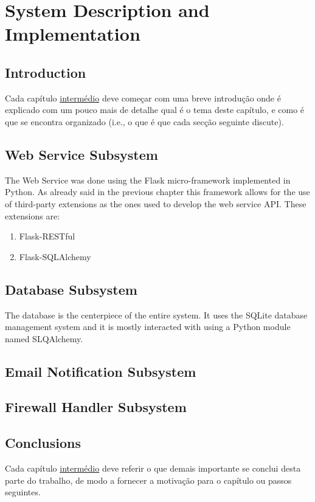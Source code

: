 \chapter{System Description and Implementation}
\label{chap:sys-desc}

\section{Introduction}
\label{chap4:sec:intro}
Cada capítulo \underline{intermédio} deve começar com uma breve introdução onde é explicado com um pouco mais de detalhe qual é o tema deste capítulo, e como é que se encontra organizado (i.e., o que é que cada secção seguinte discute).

\section{Web Service Subsystem}
\label{chap4:sec:web-sys}
The Web Service was done using the Flask micro-framework implemented in Python.
As already said in the previous chapter this framework allows for the use of
third-party extensions as the ones used to develop the web service API. These
extensions are:
\begin{enumerate}
	\item Flask-RESTful
	\item Flask-SQLAlchemy
\end{enumerate}


\section{Database Subsystem}
\label{chap4:sec:db-sys}
The database is the centerpiece of the entire system. It uses the SQLite
database management system and it is mostly interacted with using a Python
module named SLQAlchemy.

\section{Email Notification Subsystem}
\label{chap4:sec:email-sys}

\section{Firewall Handler Subsystem}
\label{chap4:sec:firewall-sys}

\section{Conclusions}
\label{chap4:sec:concs}
Cada capítulo \underline{intermédio} deve referir o que demais importante se conclui desta parte do trabalho, de modo a fornecer a motivação para o capítulo ou passos seguintes.
